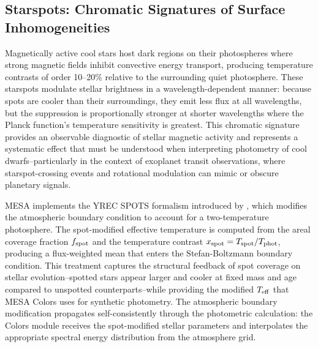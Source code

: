 \documentclass[linenumbers,apj,twocolumn, floatfix]{aastex701} \usepackage{amsmath} \usepackage{longtable} \usepackage{graphicx} \usepackage{ulem} \usepackage{xcolor} \usepackage{lettrine} \usepackage{yfonts} \usepackage{rotating}
\begin{document}
\subsection{Starspots: Chromatic Signatures of Surface Inhomogeneities}
\label{sec:demo_starspots}

Magnetically active cool stars host dark regions on their photospheres where strong magnetic fields inhibit convective energy transport, producing temperature contrasts of order 10--20\% relative to the surrounding quiet photosphere.
These starspots modulate stellar brightness in a wavelength-dependent manner: because spots are cooler than their surroundings, they emit less flux at all wavelengths, but the suppression is proportionally stronger at shorter wavelengths where the Planck function's temperature sensitivity is greatest.
This chromatic signature provides an observable diagnostic of stellar magnetic activity and represents a systematic effect that must be understood when interpreting photometry of cool dwarfs--particularly in the context of exoplanet transit observations, where starspot-crossing events and rotational modulation can mimic or obscure planetary signals.

MESA implements the YREC SPOTS formalism introduced by \citet{Somers2015}, which modifies the atmospheric boundary condition to account for a two-temperature photosphere.
The spot-modified effective temperature is computed from the areal coverage fraction $f_{\rm spot}$ and the temperature contrast $x_{\rm spot} = T_{\rm spot}/T_{\rm phot}$, producing a flux-weighted mean that enters the Stefan-Boltzmann boundary condition.
This treatment captures the structural feedback of spot coverage on stellar evolution--spotted stars appear larger and cooler at fixed mass and age compared to unspotted counterparts--while providing the modified $T_{\rm eff}$ that MESA Colors uses for synthetic photometry.
The atmospheric boundary modification propagates self-consistently through the photometric calculation: the Colors module receives the spot-modified stellar parameters and interpolates the appropriate spectral energy distribution from the atmosphere grid.
\end{document}
